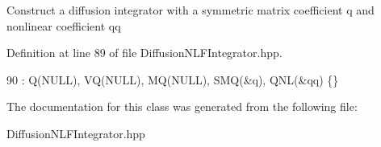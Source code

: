 Construct a diffusion integrator with a symmetric matrix coefficient q and nonlinear coefficient qq 

Definition at line 89 of file Diffusion\+N\+L\+F\+Integrator.\+hpp.


\begin{DoxyCode}
90       : Q(NULL), VQ(NULL), MQ(NULL), SMQ(&q), QNL(&qq) \{\}
\end{DoxyCode}


The documentation for this class was generated from the following file\+:\begin{DoxyCompactItemize}
\item 
Diffusion\+N\+L\+F\+Integrator.\+hpp\end{DoxyCompactItemize}
